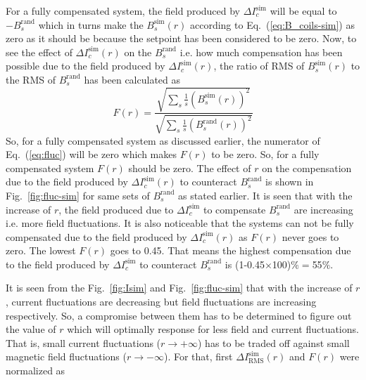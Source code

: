 For a fully compensated system, the field produced by $ \Delta I_c^{\text{sim}}$ will be equal to $- B_s^{\text{rand}}$ which in turns make the $B_s^{\text{sim}}(r)$ according to Eq.~(\ref{eq:B_coils-sim}) as zero as it should be because the setpoint has been considered to be zero. Now, to see the effect of $ \Delta I_c^{\text{sim}}(r)$ on the $B_s^{\text{rand}}$ i.e. how much compensation has been possible due to the field produced by $ \Delta I_c^{\text{sim}}(r)$,  the ratio of RMS of $B_s^{\text{sim}}(r)$ to the RMS of $B_s^{\text{rand}}$ has been calculated as
\begin{equation}\label{eq:fluc}
    F(r)=\frac{\sqrt{\sum_s \frac{1}{s}(B_s^{\text{sim}}(r))^2}}{\sqrt{\sum_s \frac{1}{s}(B_s^{\text{rand}}(r))^2}}
\end{equation}
So, for a fully compensated system as discussed earlier, the numerator of Eq.~(\ref{eq:fluc}) will be zero which makes $F(r)$ to be zero. So, for a fully compensated system $F(r)$ should be zero. The effect of $r$ on the compensation due to the field produced by $ \Delta I_c^{\text{sim}}(r)$ to counteract $B_s^{\text{rand}}$ is shown in Fig.~\ref{fig:fluc-sim} for same sets of $B_s^{\text{rand}}$ as stated earlier. It is seen that with the increase of $r$, the field produced due to $\Delta I_c^{\text{sim}}$ to compensate $B_s^{\text{rand}}$  are increasing i.e. more field fluctuations. It is also noticeable that the systems can not be fully compensated due to the field produced by $ \Delta I_c^{\text{sim}}(r)$ as $F(r)$ never goes to zero. The lowest $F(r)$ goes to 0.45. That means the highest compensation due to the field produced by  $\Delta I_c^{\text{sim}}$ to counteract $B_s^{\text{rand}}$ is (1-0.45$\times$100)$\%=$55$\%$.


\FloatBarrier
It is seen from the Fig.~\ref{fig:Isim} and Fig.~\ref{fig:fluc-sim} that with the increase of $r$, current fluctuations are decreasing but field fluctuations are increasing respectively. So, a compromise between them has to be determined to figure out the value of $r$ which will optimally response for less field and current fluctuations.  That is, small current fluctuations ($r \rightarrow + \infty$) has to be traded off against small magnetic field fluctuations ($r \rightarrow - \infty$). For that, first $\Delta I_{\text{RMS}}^{\text{sim}}(r)$ and $F(r)$ were normalized as

